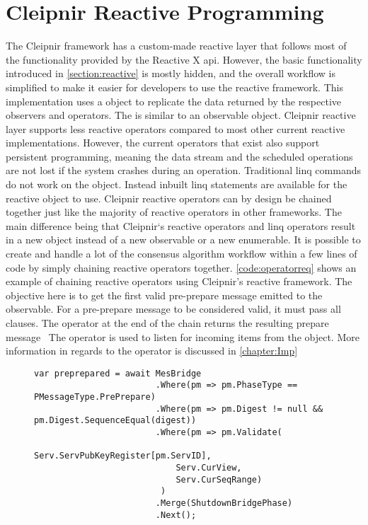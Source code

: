 \section{Cleipnir Reactive Programming}
The Cleipnir framework has a custom-made reactive layer that follows most of the functionality provided by the Reactive X \ac{api}. However, the basic functionality introduced in \autoref{section:reactive} is mostly hidden, and the overall workflow is simplified to make it easier for developers to use the reactive framework. This implementation uses a  object to replicate the data returned by the respective observers and operators. The  is similar to an observable object.
Cleipnir reactive layer supports less reactive operators compared to most other current reactive implementations. However, the current operators that exist also support persistent programming, meaning the data stream and the scheduled operations are not lost if the system crashes during an operation. Traditional \ac{linq} commands do not work on the  object. Instead inbuilt \ac{linq} statements are available for the reactive  object to use. Cleipnir reactive operators can by design be chained together just like the majority of reactive operators in other frameworks. The main difference being that Cleipnir`s reactive operators and \ac{linq} operators result in a new  object instead of a new observable or a new enumerable. It is possible to create and handle a lot of the consensus algorithm workflow within a few lines of code by simply chaining reactive operators together. \autoref{code:operatorreq} shows an example of chaining reactive operators using Cleipnir’s reactive framework. The objective here is to get the first valid pre-prepare message emitted to the observable. For a pre-prepare message to be considered valid, it must pass all  clauses. The  operator at the end of the chain returns the resulting prepare message~\cites[p.~6,8,13]{PAPER:PaxosCleipnir}{WEB:ReactiveOperator} The  operator is used to listen for incoming items from the   object. More information in regards to the  operator is discussed in \autoref{chapter:Imp}


\begin{figure}[H]
	\centering
	\begin{lstlisting}[label = code:operatorreq, caption=Example of chaining Cleipnir reactive operators, captionpos=b, basicstyle=\scriptsize]
var preprepared = await MesBridge
                        .Where(pm => pm.PhaseType == PMessageType.PrePrepare)
                        .Where(pm => pm.Digest != null && pm.Digest.SequenceEqual(digest))
                        .Where(pm => pm.Validate(
                            Serv.ServPubKeyRegister[pm.ServID], 
                            Serv.CurView, 
                            Serv.CurSeqRange)
                         )
                        .Merge(ShutdownBridgePhase)
                        .Next();
\end{lstlisting}
\end{figure}

